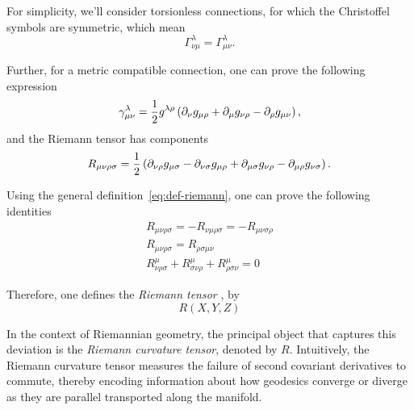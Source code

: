 For simplicity, we'll consider torsionless connections, for which the Christoffel symbols are symmetric, which mean
\begin{equation}
    \Gamma^\lambda_{\nu\mu} = \Gamma^\lambda_{\mu\nu} .
\end{equation}

Further, for a metric compatible connection, one can prove the following expression
\begin{equation}
    \gamma^\lambda_{\mu\nu} = \frac{1}{2} g^{\lambda\rho} \left( \partial_\nu g_{\mu\rho} + \partial_\mu g_{\nu\rho} - \partial_\rho g_{\mu\nu} \right),
\end{equation}
and the Riemann tensor has components
\begin{equation}
    R_{\mu\nu\rho\sigma} = \frac{1}{2} \left( \partial_{\nu\rho} g_{\mu\sigma} - \partial_{\nu\sigma} g_{\mu\rho} + \partial_{\mu\sigma} g_{\nu\rho} - \partial_{\mu\rho} g_{\nu\sigma} \right) .
\end{equation}

Using the general definition~\eqref{eq:def-riemann}, one can prove the following identities
\begin{subequations}
\begin{gather}
    R_{\mu\nu\rho\sigma} = - R_{\nu\mu\rho\sigma} = - R_{\mu\nu\sigma\rho} \\
    R_{\mu\nu\rho\sigma} = R_{\rho\sigma\mu\nu} \\
    R^\mu_{\nu\rho\sigma} + R^\mu_{\sigma\nu\rho} + R^\mu_{\rho\sigma\nu} = 0
\end{gather}
\end{subequations}


Therefore, one defines the \emph{Riemann tensor} , by
\begin{equation}
    R(X,Y,Z)
\end{equation}

In the context of Riemannian geometry, the principal object that captures this deviation is the \emph{Riemann curvature tensor}, denoted by \( R \). Intuitively, the Riemann curvature tensor measures the failure of second covariant derivatives to commute, thereby encoding information about how geodesics converge or diverge as they are parallel transported along the manifold.

